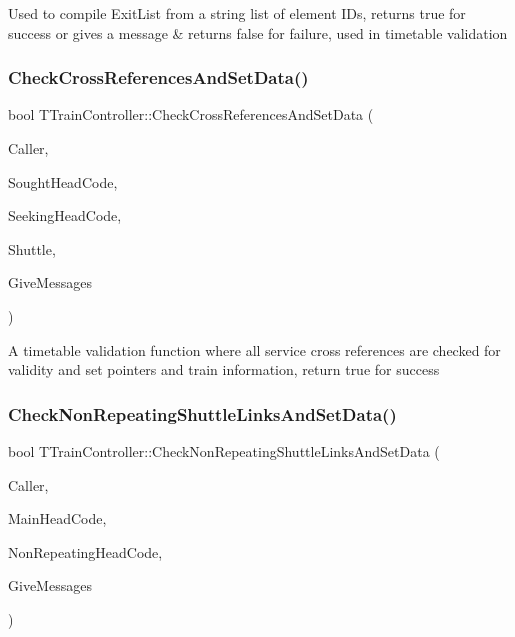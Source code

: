 Used to compile Exit\+List from a string list of element I\+Ds, returns true for success or gives a message \& returns false for failure, used in timetable validation \mbox{\label{class_t_train_controller_a72662be9ecd0e95131779bd10b6fe14f}} 
\subsubsection{\texorpdfstring{Check\+Cross\+References\+And\+Set\+Data()}{CheckCrossReferencesAndSetData()}}
{\footnotesize\ttfamily bool T\+Train\+Controller\+::\+Check\+Cross\+References\+And\+Set\+Data (\begin{DoxyParamCaption}\item[{int}]{Caller,  }\item[{Ansi\+String}]{Sought\+Head\+Code,  }\item[{Ansi\+String}]{Seeking\+Head\+Code,  }\item[{bool}]{Shuttle,  }\item[{bool}]{Give\+Messages }\end{DoxyParamCaption})}

A timetable validation function where all service cross references are checked for validity and set pointers and train information, return true for success \mbox{\label{class_t_train_controller_aa991976bc8ea956f9e9230f6a6921ac1}} 
\subsubsection{\texorpdfstring{Check\+Non\+Repeating\+Shuttle\+Links\+And\+Set\+Data()}{CheckNonRepeatingShuttleLinksAndSetData()}}
{\footnotesize\ttfamily bool T\+Train\+Controller\+::\+Check\+Non\+Repeating\+Shuttle\+Links\+And\+Set\+Data (\begin{DoxyParamCaption}\item[{int}]{Caller,  }\item[{Ansi\+String}]{Main\+Head\+Code,  }\item[{Ansi\+String}]{Non\+Repeating\+Head\+Code,  }\item[{bool}]{Give\+Messages }\end{DoxyParamCaption})}

